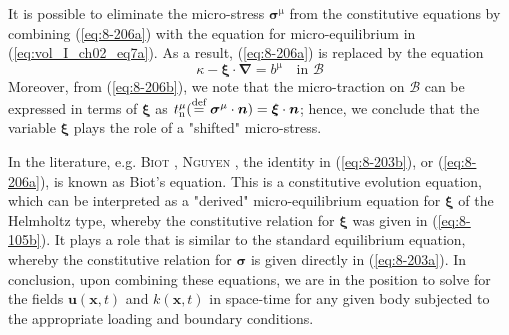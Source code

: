 It is possible to eliminate the micro-stress $\bm{\sigma}^{\mathrm{\mu}}$ from the constitutive equations by combining (\ref{eq:8-206a}) with the equation for micro-equilibrium in (\ref{eq:vol_I_ch02_eq7a}). As a result, (\ref{eq:8-206a}) is replaced by the equation
\begin{equation}
    \kappa - \bm{\xi}\cdot\bm{\nabla} = b^{\mathrm{\mu}} \quad
    \mbox{in }  \mathcal{B}
\label{eq:8-207}
\end{equation}
Moreover, from (\ref{eq:8-206b}), we note that the micro-traction on $\mathcal{B}$ can be expressed in terms of $\bm{\xi}$ as $t_{\mathrm{n}}^{\mathrm{\mu}}(\stackrel{\text{def}}{=}\bm{\sigma}^{\mathrm{\mu}}\cdot\bm{n})     =\bm{\xi}\cdot\bm{n}$; hence, we conclude that the variable $\bm{\xi}$ plays the role of a "shifted" micro-stress.

In the literature, e.g. {\scshape Biot} \cite{Biot1965}, {\scshape Nguyen} \cite{Nguyen2000}, the identity in (\ref{eq:8-203b}), or (\ref{eq:8-206a}), is known as Biot's equation. This is a constitutive evolution equation, which can be interpreted as a "derived" micro-equilibrium equation for $\bm{\xi}$ of the Helmholtz type, whereby the constitutive relation for $\bm{\xi}$ was given in (\ref{eq:8-105b}). It plays a role that is similar to the standard equilibrium equation, whereby the constitutive relation for $\bm{\sigma}$ is given directly in (\ref{eq:8-203a}). In conclusion, upon combining these equations, we are in the position to solve for the fields $\bm{u}(\bm{x},t)$ and $k(\bm{x},t)$ in space-time for any given body subjected to the appropriate loading and boundary conditions.

